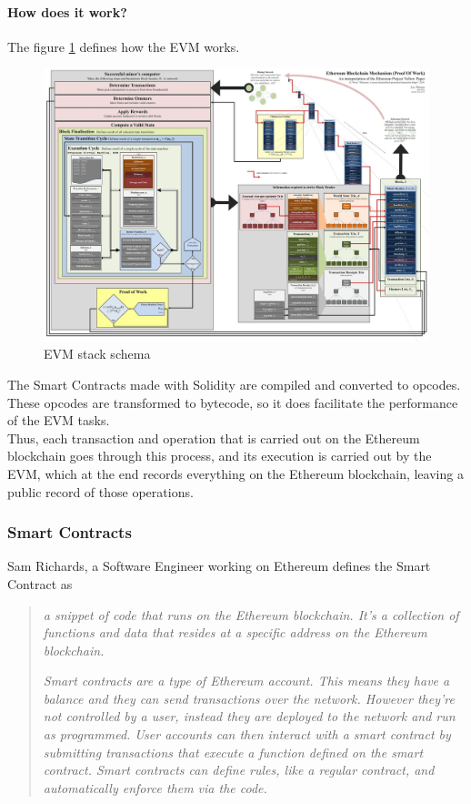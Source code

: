 \documentclass[a4paper, 12pt]{article} %
\begin{document}
            \paragraph{How does it work?}
                The figure \ref{fig:blockchain_stack} defines how the EVM works\cite{queEsEvm}.
                \begin{figure}[h]
                    \centering
                    \includegraphics[width=1\textwidth]{evm-stack.jpeg}
                    \caption{EVM stack schema}
                    \label{fig:blockchain_stack}
                \end{figure}

                The Smart Contracts made with Solidity are compiled and converted to opcodes. These opcodes are transformed to bytecode, so it does facilitate the performance of the EVM tasks.\\

                Thus, each transaction and operation that is carried out on the Ethereum blockchain goes through this process, and its execution is carried out by the EVM, which at the end records everything on the Ethereum blockchain, leaving a public record of those operations. 

        \subsubsection{Smart Contracts}
            Sam Richards\cite{smartContracts}, a Software Engineer working on Ethereum defines the Smart Contract as 
            \begin{quote}
                \textit{a snippet of code that runs on the Ethereum blockchain. It's a collection of functions and data that resides at a specific address on the Ethereum blockchain.}

                \textit{Smart contracts are a type of Ethereum account. This means they have a balance and they can send transactions over the network. However they're not controlled by a user, instead they are deployed to the network and run as programmed. User accounts can then interact with a smart contract by submitting transactions that execute a function defined on the smart contract. Smart contracts can define rules, like a regular contract, and automatically enforce them via the code.}
            \end{quote}
\end{document}
